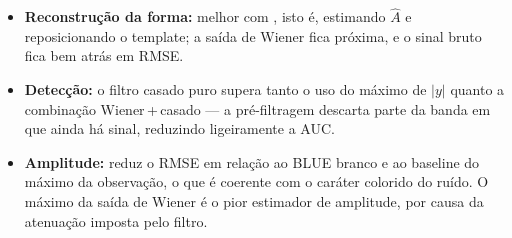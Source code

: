 \begin{itemize}
  \item \textbf{Reconstrução da forma:} melhor com \valBestWave, isto é,
  estimando \(\hat{A}\) e reposicionando o template; a saída de Wiener fica
  próxima, e o sinal bruto fica bem atrás em RMSE.
  \item \textbf{Detecção:} o filtro casado puro supera tanto o uso do máximo de
  \(|y|\) quanto a combinação Wiener\,+\,casado --- a pré-filtragem descarta
  parte da banda em que ainda há sinal, reduzindo ligeiramente a AUC.
  \item \textbf{Amplitude:} \valBestAmp reduz o RMSE em relação ao BLUE branco
  e ao baseline do máximo da observação, o que é coerente com o caráter
  colorido do ruído. O máximo da saída de Wiener é o pior estimador de
  amplitude, por causa da atenuação imposta pelo filtro.
\end{itemize}
